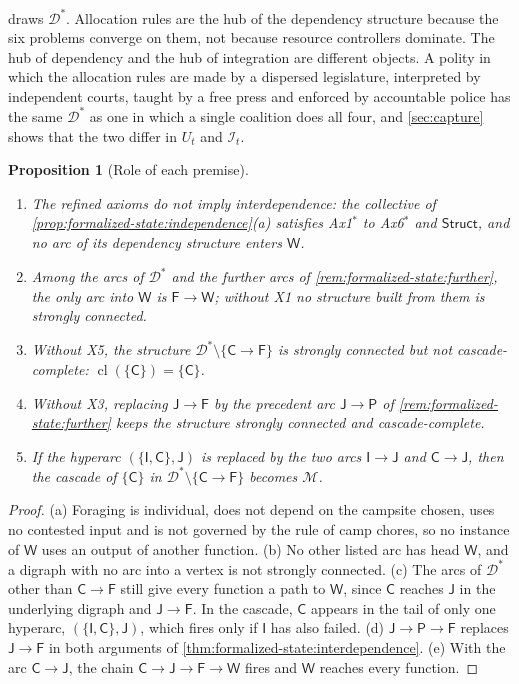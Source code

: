\documentclass[11pt,letterpaper]{article}
\newtheorem{proposition}[theorem]{Proposition}
\theoremstyle{definition}
\theoremstyle{remark}
\newcommand{\pF}{\mathsf{F}}
\newcommand{\pP}{\mathsf{P}}
\newcommand{\pJ}{\mathsf{J}}
\newcommand{\pI}{\mathsf{I}}
\newcommand{\pC}{\mathsf{C}}
\newcommand{\pW}{\mathsf{W}}
\newcommand{\Mset}{\mathcal{M}}
\newcommand{\Integ}{\mathcal{I}}
\newcommand{\Struct}{\mathsf{Struct}}
\newcommand{\Dstar}{\mathcal{D}^{*}}
\newcommand{\cl}{\operatorname{cl}}
\begin{document}
 draws $\Dstar$. Allocation rules are the hub of the dependency structure because the six problems converge on them, not because resource controllers dominate. The hub of dependency and the hub of integration are different objects. A polity in which the allocation rules are made by a dispersed legislature, interpreted by independent courts, taught by a free press and enforced by accountable police has the same $\Dstar$ as one in which a single coalition does all four, and \cref{sec:capture} shows that the two differ in $U_t$ and $\Integ_t$.

\begin{proposition}[Role of each premise]
\label{prop:formalized-state:minimality}
\leavevmode
\begin{enumerate}[label=(\alph*)]
\item The refined axioms do not imply interdependence: the collective of \cref{prop:formalized-state:independence}(a) satisfies Ax1$^{*}$ to Ax6$^{*}$ and $\Struct$, and no arc of its dependency structure enters $\pW$.
\item Among the arcs of $\Dstar$ and the further arcs of \cref{rem:formalized-state:further}, the only arc into $\pW$ is $\pF\to\pW$; without X1 no structure built from them is strongly connected.
\item Without X5, the structure $\Dstar\setminus\{\pC\to\pF\}$ is strongly connected but not cascade-complete: $\cl(\{\pC\})=\{\pC\}$.
\item Without X3, replacing $\pJ\to\pF$ by the precedent arc $\pJ\to\pP$ of \cref{rem:formalized-state:further} keeps the structure strongly connected and cascade-complete.
\item If the hyperarc $(\{\pI,\pC\},\pJ)$ is replaced by the two arcs $\pI\to\pJ$ and $\pC\to\pJ$, then the cascade of $\{\pC\}$ in $\Dstar\setminus\{\pC\to\pF\}$ becomes $\Mset$.
\end{enumerate}
\end{proposition}

\begin{proof}
(a) Foraging is individual, does not depend on the campsite chosen, uses no contested input and is not governed by the rule of camp chores, so no instance of $\pW$ uses an output of another function. (b) No other listed arc has head $\pW$, and a digraph with no arc into a vertex is not strongly connected. (c) The arcs of $\Dstar$ other than $\pC\to\pF$ still give every function a path to $\pW$, since $\pC$ reaches $\pJ$ in the underlying digraph and $\pJ\to\pF$. In the cascade, $\pC$ appears in the tail of only one hyperarc, $(\{\pI,\pC\},\pJ)$, which fires only if $\pI$ has also failed. (d) $\pJ\to\pP\to\pF$ replaces $\pJ\to\pF$ in both arguments of \cref{thm:formalized-state:interdependence}. (e) With the arc $\pC\to\pJ$, the chain $\pC\to\pJ\to\pF\to\pW$ fires and $\pW$ reaches every function.
\end{proof}
\end{document}
